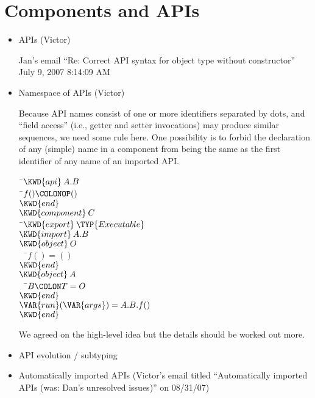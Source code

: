 \section{Components and APIs}
\begin{itemize}
\item %
APIs (Victor)

Jan's email ``Re: Correct API syntax for object type without constructor''
July 9, 2007 8:14:09 AM

\item Namespace of APIs (Victor)

Because API names consist of one or more identifiers separated by dots, and ``field access'' (i.e., getter and setter invocations) may produce similar sequences, we need some rule here. One possibility is to forbid the declaration of any (simple) name in a component from being the same as the first identifier of any name of an imported API.


\begin{Fortress}
{\tt~}\pushtabs\=\+\( \KWD{api}\:A.B\)\\
{\tt~}\pushtabs\=\+\(  f()\COLONOP()\)\-\\\poptabs
\( \KWD{end}\)\\[4pt]
\( \KWD{component}\:C\)\\
{\tt~}\pushtabs\=\+\(  \KWD{export}\:\TYP{Executable}\)\\
\(  \KWD{import}\:A.B\)\\
\(  \KWD{object}\:O\)\\
{\tt~~}\pushtabs\=\+\(    f() = ()\)\-\\\poptabs
\(  \KWD{end}\)\\
\(  \KWD{object}\:A\)\\
{\tt~~}\pushtabs\=\+\(    B\COLON T = O\)\-\\\poptabs
\(  \KWD{end}\)\\
\(  \VAR{run}(\VAR{args}) = A.B.f()\)\-\\\poptabs
\( \KWD{end}\)\-\\\poptabs
\end{Fortress}
We agreed on the high-level idea but the details should be worked out more.

\item API evolution / subtyping
\item Automatically imported APIs (Victor's email titled
``Automatically imported APIs (was: Dan's unresolved issues)'' on 08/31/07)


\end{itemize}
